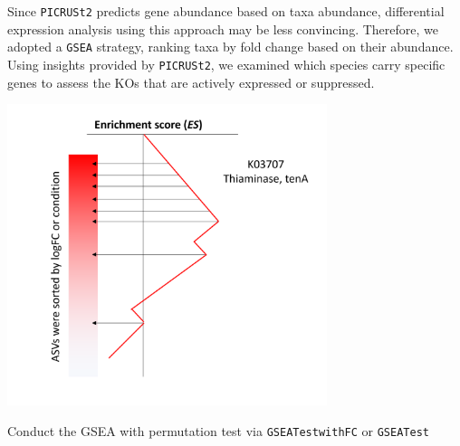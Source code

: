 \documentclass[
]{article}
\begin{document}
Since \texttt{PICRUSt2} predicts gene abundance based on taxa abundance,
differential expression analysis using this approach may be less
convincing. Therefore, we adopted a \texttt{GSEA} strategy, ranking taxa
by fold change based on their abundance. Using insights provided by
\texttt{PICRUSt2}, we examined which species carry specific genes to
assess the KOs that are actively expressed or suppressed.

\includegraphics[width=0.7\textwidth,height=\textheight]{images/Fig15.png}

Conduct the GSEA with permutation test via \texttt{GSEATestwithFC} or
\texttt{GSEATest}
\end{document}
